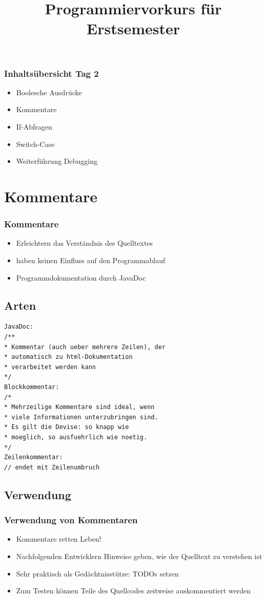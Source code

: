 \documentclass[final]{beamer}
\title{Programmiervorkurs für Erstsemester}
\begin{document}
\lstset{tabsize=2}
\lstset{basicstyle=\small}
\lstset{language=java}
\lstset{showstringspaces=false}
\begin{frame}
  \titlepage
\end{frame}

\begin{frame}
	\frametitle{Inhaltsübersicht Tag 2}
	\begin{itemize}
		\item {Boolesche Ausdrücke}
		\item {Kommentare}
		\item {If-Abfragen}
		\item {Switch-Case}
		\item {Weiterführung Debugging}
	\end{itemize}
\end{frame}

\section{Kommentare}
\begin{frame}
	\frametitle{Kommentare}
	\begin{itemize}
		\item{Erleichtern das Verständnis des Quelltextes}
		\item{haben keinen Einfluss auf den Programmablauf}
		\item{Programmdokumentation durch JavaDoc}
	\end{itemize}
\end{frame}

\subsection{Arten}
\begin{frame}[containsverbatim]
	\begin{lstlisting}
JavaDoc:
/**
* Kommentar (auch ueber mehrere Zeilen), der
* automatisch zu html-Dokumentation
* verarbeitet werden kann
*/
Blockkommentar:
/*
* Mehrzeilige Kommentare sind ideal, wenn
* viele Informationen unterzubringen sind.
* Es gilt die Devise: so knapp wie
* moeglich, so ausfuehrlich wie noetig.
*/
Zeilenkommentar:
// endet mit Zeilenumbruch
	\end{lstlisting}
\end{frame}

\subsection{Verwendung}
\begin{frame}
	\frametitle{Verwendung von Kommentaren}
	\begin{itemize}
		\item{Kommentare retten Leben!}
		\item{Nachfolgenden Entwicklern Hinweise geben, wie der Quelltext zu verstehen ist}
		\item{Sehr praktisch als Gedächtnisstütze: TODOs setzen}
		\item{Zum Testen können Teile des Quellcodes zeitweise auskommentiert werden}
	\end{itemize}
\end{frame}
\end{document}
